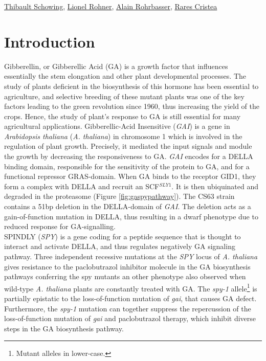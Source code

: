 \documentclass[10pt,a4paper]{article}
\begin{document}
\href{mailto:thibault.schowing@unifr.ch}{Thibault Schowing}, \href{mailto:lio_roh@students.unibe.ch}{Lionel Rohner},
\href{mailto:alain.rohrbasser.unifr.ch}{Alain Rohrbasser},
\href{mailto:rares.cristea@unifr.ch}{Rares Cristea}\\

\section*{\large Introduction}
Gibberellin, or Gibberellic Acid (GA) is a growth factor that influences essentially the stem elongation and other plant developmental processes\cite{hooley_gibberellins:_nodate}. The study of plants deficient in the biosynthesis of this hormone has been essential to agriculture, and selective breeding of these mutant plants  was one of the key factors leading to the green revolution since 1960, thus increasing the yield of the crops. Hence, the study of plant’s response to GA is still essential for many agricultural applications\cite{ordonio_new_2017}. Gibberellic-Acid Insensitive (\textit{GAI}) is a gene in \textit{Arabidopsis thaliana} (\textit{A. thaliana}) in chromosome 1 which is involved in the regulation of plant growth. Precisely, it mediated the input signals and module the growth by decreasing the responsiveness to GA\cite{peng_arabidopsis_1997}.
\textit{GAI} encodes for a DELLA binding domain, responsible for the sensitivity of the protein to GA, and for a functional repressor GRAS-domain. When GA binds to the receptor GID1, they form a complex with DELLA and recruit an SCF$^{SLY1}$. It is then ubiquinated and degraded in the proteasome (Figure \ref{fig:gaspypathway})\cite{hauvermale_gibberellin_2012}. The CS63 strain contains a 51bp deletion in the DELLA-domain of \textit{GAI}. The deletion acts as a gain-of-function mutation in DELLA, thus resulting in a dwarf phenotype due to reduced response for GA-signalling\cite{peng_arabidopsis_1997,lee_gibberellin_2002}.\\


\noindent SPINDLY (\textit{SPY}) is a gene coding for a peptide sequence that is thought to interact and activate DELLA, and thus regulates negatively GA signaling pathway\cite{zentella_arabidopsis_2017}. Three independent recessive mutations at the \textit{SPY} locus of \textit{A. thaliana} gives resistance to the paclobutrazol inhibitor molecule in the GA biosynthesis pathways conferring the spy mutants an other phenotype also observed when wild-type \textit{A. thaliana} plants are constantly treated with GA. The \textit{spy-1} allele\footnote{Mutant alleles in lower-case.} is partially epistatic to the loss-of-function mutation of \textit{gai}, that causes GA defect. Furthermore, the \textit{spy-1} mutation can together suppress the repercussion of the loss-of-function mutation of \textit{gai} and paclobutrazol therapy, which inhibit diverse steps in the GA biosynthesis pathway\cite{lee_gibberellin_2002, jacobsen_mutations_nodate}.\\
\end{document}
